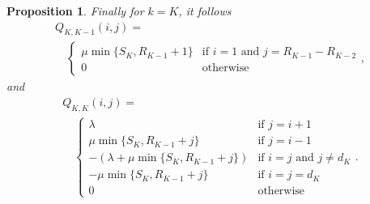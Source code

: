 \documentclass[conference]{IEEEtran}
\newtheorem{prosi}{Proposition}
\begin{document}
\begin{prosi}
%

Finally for $k=K$, it follows
\begin{multline*}
Q_{K,K \!-\!1}(i,j) = \\
\quad
\begin{cases}
\mu \min\{S_{K},R_{K \!-\!1} \!+\!1\}   & \! \mbox{if} \, \, i\!=\!1 \, \, \mbox{and} \, \,  j\!=\!R_{K \!-\!1}\!-\!R_{K\!-\!2}\\
0                                       & \! \mbox{otherwise}
\end{cases} ,
\end{multline*}
and
\begin{multline*}
Q_{K,K}(i,j) = \\
\quad
\begin{cases}
\lambda                                     & \mbox{if } j=i+1\\
\mu \min\{S_{K},R_{K\!-\!1}+j\}             & \mbox{if } j=i-1\\
-(\lambda+ \mu \min\{S_{K},R_{K-1}\!+\!j\}) & \mbox{if } i=j \mbox{ and } j \neq \! d_{K}\\
- \mu \min\{S_{K},R_{K-1}+j\}               & \mbox{if } i=j=\! d_{K}\\
0                                           & \mbox{otherwise}
\end{cases}.
\end{multline*}


\end{prosi}
\end{document}
